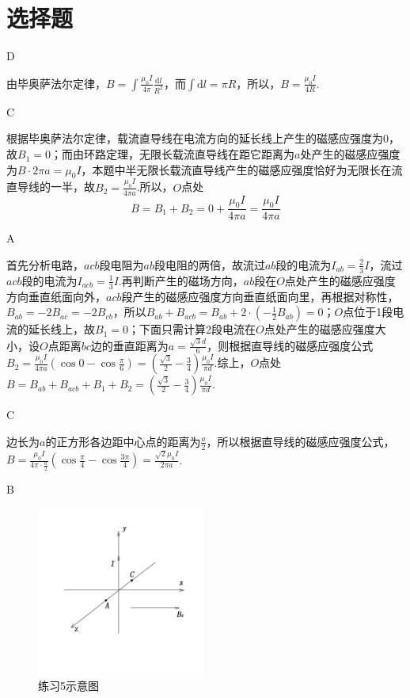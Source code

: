 \documentclass[b5paper,opensource,sourcefont,parskip]{qyxf-book}
\newcommand{\di}[1]{\mathrm{d}#1}
\begin{document}
\section{选择题}  %

D  %

\solve
由毕奥萨法尔定律，$B=\int\frac{\mu_0I}{4\pi}\frac{\di l}{R^2}$，而$\int\di l=\pi R$，所以，$B=\frac{\mu_0I}{4R}$.

C

\solve
根据毕奥萨法尔定律，载流直导线在电流方向的延长线上产生的磁感应强度为0，故$B_1=0$；而由环路定理，无限长载流直导线在距它距离为$a$处产生的磁感应强度为$B\cdot2\pi a=\mu_0I$，本题中半无限长载流直导线产生的磁感应强度恰好为无限长在流直导线的一半，故$B_2=\frac{\mu_0I}{4\pi a}$.所以，$O$点处
\begin{equation*}
B=B_1+B_2=0+\frac{\mu_0I}{4\pi a}=\frac{\mu_0I}{4\pi a}
\end{equation*}

A

\solve
首先分析电路，$acb$段电阻为$ab$段电阻的两倍，故流过$ab$段的电流为$I_{ab}=\frac{2}{3}I$，流过$acb$段的电流为$I_{acb}=\frac{1}{3}I$.再判断产生的磁场方向，$ab$段在$O$点处产生的磁感应强度方向垂直纸面向外，$acb$段产生的磁感应强度方向垂直纸面向里，再根据对称性，$B_{ab}=-2B_{ac}=-2B_{cb}$，所以$B_{ab}+B_{acb}=B_{ab}+2\cdot(-\frac{1}{2}B_{ab})=0$；$O$点位于1段电流的延长线上，故$B_1=0$；下面只需计算2段电流在$O$点处产生的磁感应强度大小，设$O$点距离$bc$边的垂直距离为$a=\frac{\sqrt{3}d}{6}$，则根据直导线的磁感应强度公式$B_2=\frac{\mu_0I}{4\pi a}(\cos 0-\cos\frac{\pi}{6})=(\frac{\sqrt{3}}{2}-\frac{3}{4})\frac{\mu_0I}{\pi d}$.综上，$O$点处$B=B_{ab}+B_{acb}+B_1+B_2=(\frac{\sqrt{3}}{2}-\frac{3}{4})\frac{\mu_0I}{\pi d}$.

C

\solve
边长为$a$的正方形各边距中心点的距离为$\frac{a}{2}$，所以根据直导线的磁感应强度公式，$B=\frac{\mu_0I}{4\pi\cdot\frac{a}{2}}(\cos\frac{\pi}{4}-\cos\frac{3\pi}{4})=\frac{\sqrt{2}\mu_0I}{2\pi a}$.

B

\begin{figure}[htbp]  %
	\centering
	\includegraphics[width=15em, height=15em]{Chp8_illus1.jpg}
	\caption{练习5示意图}
	\label{fig:c8-t5}
\end{figure}
\end{document}

